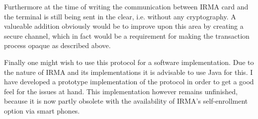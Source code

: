 Furthermore at the time of writing the communication between IRMA card and the terminal is still being sent in the clear, i.e. without any cryptography. A valueable addition obviously would be to improve upon this area by creating a secure channel, which in fact would be a requirement for making the transaction process opaque as described above.

Finally one might wish to use this protocol for a software implementation. Due to the nature of IRMA and its implementations it is advisable to use Java for this. I have developed a prototype implementation of the protocol in order to get a good feel for the issues at hand. This implementation however remains unfinished, because it is now partly obsolete with the availability of IRMA's self-enrollment option via smart phones.
